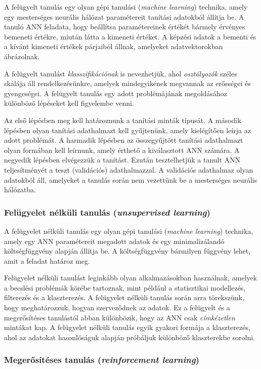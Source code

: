 \documentclass[12pt,a4]{article}
\begin{document}
	A felügyelt tanulás egy olyan gépi tanulási (\textit{machine learning}) technika, amely egy mesterséges neurális hálózat paramétereit tanítási
	adatokból állítja be. A tanuló ANN feladata, hogy beállítsa paramétereinek értékét bármely érvényes bemeneti értékre, miután látta a kimeneti értéket.
	A képzési adatok a bementi és a kívánt kimeneti értékek párjaiból állnak, amelyeket adatvektorokban ábrázolnak.
	
	
	A felügyelt tanulást \textit{klasszifikációnak} is nevezhetjük, ahol \textit{osztályozók} széles skálája áll rendelkezésünkre, amelyek mindegyikének megvannak az erősségei és gyengeségei.
	A felügyelt tanulás egy
	adott problémájának megoldásához különböző lépéseket kell figyelembe venni.
	
	 Az első lépésben meg kell határoznunk a tanítási minták típusát. A második
	lépésben olyan tanítási adathalmazt kell gyűjtenünk, amely kielégítően leírja az adott problémát.
	A harmadik lépésben az összegyűjtött tanítási adathalmazt
	olyan formában kell leírnunk, amely érthető a kiválasztott ANN számára. A negyedik lépésben elvégezzük
	a tanítást. Ezután tesztelhetjük a tanult ANN teljesítményét a teszt (validációs) adathalmazzal.
	A validációs adathalmaz olyan adatokból áll, amelyeket a tanulás során nem vezettünk be a mesterséges neurális hálózatba.
	
	\subsubsection{Felügyelet nélküli tanulás (\textit{unsupervised learning})}
	
	A felügyelet nélküli tanulás egy olyan gépi tanulási (\textit{machine learning}) technika, amely egy ANN paramétereit megadott adatok és egy minimalizálandó 
	költségfüggvény alapján állítja be. A költségfüggvény bármilyen függvény lehet, amit a feladat határoz meg.
	
	
	Felügyelet nélküli tanulást leginkább olyan alkalmazásokban használnak, amelyek a becslési problémák körébe tartoznak, mint például a statisztikai modellezés, filterezés és a klaszterezés. A felügyelet 
	nélküli tanulás során arra törekszünk, hogy meghatározzuk, hogyan szerveződnek az adatok. Ez a felügyelt és a megerősítéses tanulástól abban különbözik, hogy az ANN csak \textit{címkézetlen} mintákat kap. A felügyelet nélküli tanulás egyik gyakori formája a klaszterezés, ahol az adatokat hasonlóságuk alapján próbáljuk különböző klaszterekbe sorolni.
	
	\subsubsection{Megerősítéses tanulás (\textit{reinforcement learning})}
	
\end{document}
